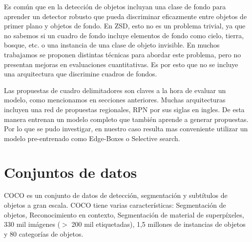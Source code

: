 Es común que en la detección de objetos incluyan una clase de fondo para aprender un detector robusto que pueda discriminar eficazmente entre objetos de primer plano y objetos de fondo. En ZSD, esto no es un problema trivial, ya que no sabemos si un cuadro de fondo incluye elementos de fondo como cielo, tierra, bosque, etc. o una instancia de una clase de objeto invisible. En muchos trabajamos se proponen distintas técnicas para abordar este problema, pero no presentan mejoras en evaluaciones cuantitativas. Es por esto que no se incluye una arquitectura que discrimine cuadros de fondos.

Las propuestas de cuadro delimitadores son claves a la hora de evaluar un modelo, como mencionamos en secciones anteriores.  Muchas arquitecturas incluyen una red de propuestas regionales, RPN por sus siglas en ingles. De esta manera entrenan un modelo completo que también aprende a generar propuestas. Por lo que se pudo investigar, en nuestro caso resulta mas conveniente utilizar un modelo pre-entrenado como Edge-Boxes o Selective search.

\section{Conjuntos de datos}
COCO es un conjunto de datos de detección, segmentación y subtítulos de objetos a gran escala. COCO tiene varias características: Segmentación de objetos,  Reconocimiento en contexto,  Segmentación de material de superpíxeles, 330 mil imágenes ($>$ 200 mil etiquetadas), 1,5 millones de instancias de objetos y 80 categorías de objetos.

